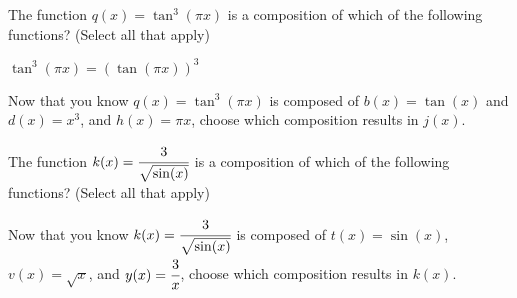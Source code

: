 \documentclass{ximera}
\begin{document}
\begin{problem}

    The function $q(x) = \tan^3(\pi x)$ is a composition of which of the following functions?  (Select all that apply)
    
    \begin{hint}
    
    $\tan^3(\pi x) = \left(\tan(\pi x)\right)^3$
    
    \end{hint}
    
        \begin{selectAll}
        \end{selectAll}
        
    \begin{problem}
        Now that you know $q(x) = \tan^3(\pi x)$ is composed of $b(x) = \tan(x)$ and $d(x) = x^3$, and $h(x) = \pi x$, choose which composition results in $j(x)$. 
        
            \begin{multipleChoice}
            \end{multipleChoice}
    \end{problem}
\end{problem}
    
\begin{problem}

    The function $k(x) = \cfrac{3}{\sqrt{\sin(x)}}$ is a composition of which of the following functions?  (Select all that apply)
    
        \begin{selectAll}
        \end{selectAll}
        
    \begin{problem}
        Now that you know $k(x) = \cfrac{3}{\sqrt{\sin(x)}}$ is composed of $t(x) = \sin(x)$, $v(x) = \sqrt{x}$, and $y(x) = \cfrac{3}{x}$, choose which composition results in $k(x)$. 
        
            \begin{multipleChoice}
            \end{multipleChoice}
    \end{problem}

\end{problem}
\end{document}
